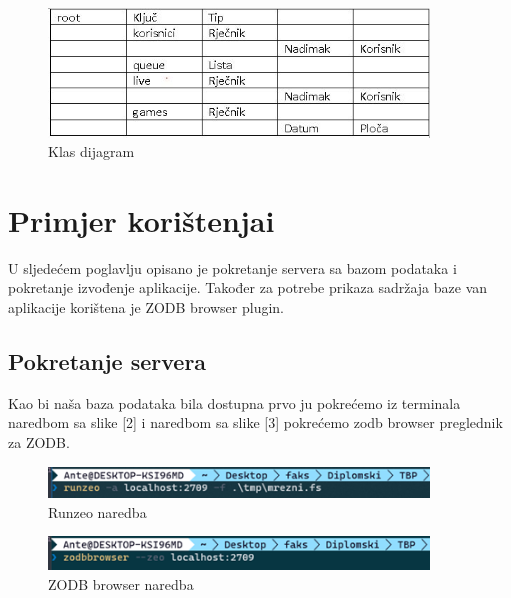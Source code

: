 \documentclass[]{foi} %
\begin{document}
\begin{figure}[]
    \centering
    \includegraphics[width=0.9\textwidth]{slike/tablica_root.jpg}
    \caption{Klas dijagram \cite{Vlastita izrada}}
    \label{fig:podjela}
\end{figure}


\chapter{Primjer korištenjai}


U sljedećem poglavlju opisano je pokretanje servera sa bazom podataka i pokretanje izvođenje aplikacije. Također za potrebe prikaza sadržaja baze van aplikacije korištena je ZODB browser plugin.




\section{Pokretanje servera }


Kao bi naša baza podataka bila dostupna prvo ju pokrećemo iz terminala naredbom sa slike [2] i naredbom sa slike [3] pokrećemo zodb browser preglednik za ZODB.



\begin{figure}[]
    \centering
    \includegraphics[width=0.9\textwidth]{slike/runzeo_command.png}
    \caption{Runzeo naredba \cite{Vlastita izrada}}
    \label{fig:podjela}
\end{figure}


\begin{figure}[]
    \centering
    \includegraphics[width=0.9\textwidth]{slike/browser_command.png}
    \caption{ZODB browser naredba \cite{Vlastita izrada}}
    \label{fig:podjela}
\end{figure}
\end{document}
